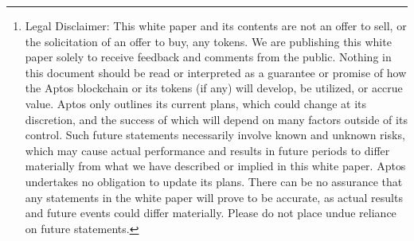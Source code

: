 \documentclass{article}
\begin{document}
\begin{abstract}
The rise of blockchains as a new Internet infrastructure has led to developers deploying tens of thousands of decentralized applications at rapidly growing rates. Unfortunately, blockchain usage is not yet ubiquitous due to frequent outages, high costs, low throughput limits, and numerous security concerns. To enable mass adoption in the web3 era, blockchain infrastructure needs to follow the path of cloud infrastructure as a trusted, scalable, cost-efficient, and continually improving platform for building widely-used applications. 
 
We present the \emph{Aptos blockchain}, designed with scalability, safety, reliability, and upgradeability as key principles, to address these challenges. The Aptos blockchain has been developed over the past three years by over 350+ developers across the globe \cite{aptos_core_github}. It offers new and novel innovations in consensus, smart contract design, system security, performance, and decentralization. The combination of these technologies will provide a fundamental building block to bring web3 to the masses:\footnote{Legal Disclaimer: This white paper and its contents are not an offer to sell, or the solicitation of an offer to buy, any tokens. We are publishing this white paper solely to receive feedback and comments from the public. Nothing in this document should be read or interpreted as a guarantee or promise of how the Aptos blockchain or its tokens (if any) will develop, be utilized, or accrue value. Aptos only outlines its current plans, which could change at its discretion, and the success of which will depend on many factors outside of its control. Such future statements necessarily involve known and unknown risks, which may cause actual performance and results in future periods to differ materially from what we have described or implied in this white paper. Aptos undertakes no obligation to update its plans. There can be no assurance that any statements in the white paper will prove to be accurate, as actual results and future events could differ materially. Please do not place undue reliance on future statements.}
 

\end{abstract}
\end{document}
